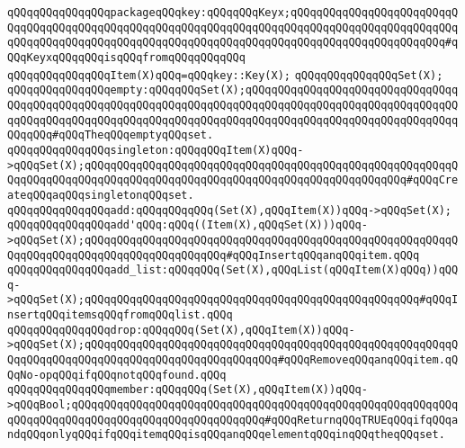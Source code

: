\verb|qQQqqQQqqQQqqQQqpackageqQQqkey:qQQqqQQqKeyx;qQQqqQQqqQQqqQQqqQQqqQQqqQQqqQQqqQQqqQQqqQQqqQQqqQQqqQQqqQQqqQQqqQQqqQQqqQQqqQQqqQQqqQQqqQQqqQQqqQQqqQQqqQQqqQQqqQQqqQQqqQQqqQQqqQQqqQQqqQQqqQQqqQQqqQQqqQQqqQQqqQQq#qQQqKeyxqQQqqQQqisqQQqfromqQQqqQQqqQQq|\newline
\newline
\verb|qQQqqQQqqQQqqQQqItem(X)qQQq=qQQqkey::Key(X);|\newline
\verb|qQQqqQQqqQQqqQQqSet(X);|\newline
\newline
\verb|qQQqqQQqqQQqqQQqempty:qQQqqQQqSet(X);qQQqqQQqqQQqqQQqqQQqqQQqqQQqqQQqqQQqqQQqqQQqqQQqqQQqqQQqqQQqqQQqqQQqqQQqqQQqqQQqqQQqqQQqqQQqqQQqqQQqqQQqqQQqqQQqqQQqqQQqqQQqqQQqqQQqqQQqqQQqqQQqqQQqqQQqqQQqqQQqqQQqqQQqqQQqqQQqqQQq#qQQqTheqQQqemptyqQQqset.|\newline
\newline
\verb|qQQqqQQqqQQqqQQqsingleton:qQQqqQQqItem(X)qQQq->qQQqSet(X);qQQqqQQqqQQqqQQqqQQqqQQqqQQqqQQqqQQqqQQqqQQqqQQqqQQqqQQqqQQqqQQqqQQqqQQqqQQqqQQqqQQqqQQqqQQqqQQqqQQqqQQqqQQqqQQqqQQqqQQq#qQQqCreateqQQqaqQQqsingletonqQQqset.|\newline
\newline
\verb|qQQqqQQqqQQqqQQqadd:qQQqqQQqqQQq(Set(X),qQQqItem(X))qQQq->qQQqSet(X);|\newline
\verb|qQQqqQQqqQQqqQQqadd'qQQq:qQQq((Item(X),qQQqSet(X)))qQQq->qQQqSet(X);qQQqqQQqqQQqqQQqqQQqqQQqqQQqqQQqqQQqqQQqqQQqqQQqqQQqqQQqqQQqqQQqqQQqqQQqqQQqqQQqqQQqqQQqqQQq#qQQqInsertqQQqanqQQqitem.qQQq|\newline
\newline
\verb|qQQqqQQqqQQqqQQqadd_list:qQQqqQQq(Set(X),qQQqList(qQQqItem(X)qQQq))qQQq->qQQqSet(X);qQQqqQQqqQQqqQQqqQQqqQQqqQQqqQQqqQQqqQQqqQQqqQQqqQQq#qQQqInsertqQQqitemsqQQqfromqQQqlist.qQQq|\newline
\newline
\verb|qQQqqQQqqQQqqQQqdrop:qQQqqQQq(Set(X),qQQqItem(X))qQQq->qQQqSet(X);qQQqqQQqqQQqqQQqqQQqqQQqqQQqqQQqqQQqqQQqqQQqqQQqqQQqqQQqqQQqqQQqqQQqqQQqqQQqqQQqqQQqqQQqqQQqqQQqqQQq#qQQqRemoveqQQqanqQQqitem.qQQqNo-opqQQqifqQQqnotqQQqfound.qQQq|\newline
\newline
\verb|qQQqqQQqqQQqqQQqmember:qQQqqQQq(Set(X),qQQqItem(X))qQQq->qQQqBool;qQQqqQQqqQQqqQQqqQQqqQQqqQQqqQQqqQQqqQQqqQQqqQQqqQQqqQQqqQQqqQQqqQQqqQQqqQQqqQQqqQQqqQQqqQQqqQQqqQQq#qQQqReturnqQQqTRUEqQQqifqQQqandqQQqonlyqQQqifqQQqitemqQQqisqQQqanqQQqelementqQQqinqQQqtheqQQqset.|\newline
